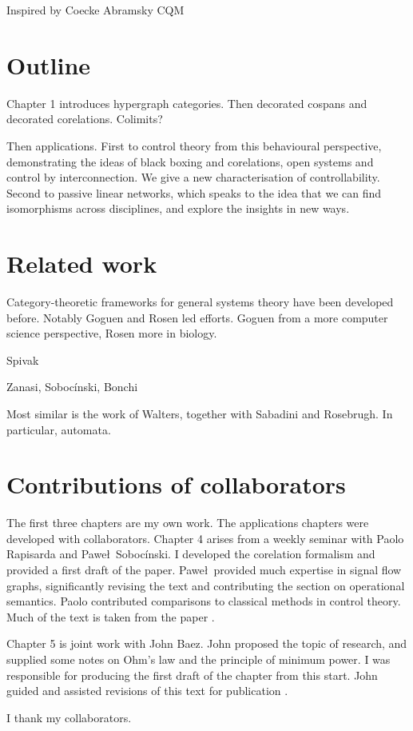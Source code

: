 Inspired by Coecke Abramsky CQM

\section{Outline}
Chapter 1 introduces hypergraph categories. Then decorated cospans and decorated
corelations. Colimits?

Then applications. First to control theory from this behavioural perspective,
demonstrating the ideas of black boxing and corelations, open systems and
control by interconnection. We give a new characterisation of controllability.
Second to passive linear networks, which speaks to the idea that we can find
isomorphisms across disciplines, and explore the insights in new ways.

\section{Related work}

Category-theoretic frameworks for general systems theory have been developed
before. Notably Goguen and Rosen led efforts. Goguen from a more computer
science perspective, Rosen more in biology.



Spivak 

Zanasi, Soboc\'inski, Bonchi

Most similar is the work of Walters, together with Sabadini and Rosebrugh. In
particular, automata.

\section{Contributions of collaborators}

The first three chapters are my own work. The applications chapters were
developed with collaborators. Chapter 4 arises from a weekly seminar with Paolo
Rapisarda and Pawe\l\ Soboc\'inski. I developed the corelation formalism and provided a
first draft of the paper. Pawe\l\ provided much expertise in signal flow graphs,
significantly revising the text and contributing the section on operational
semantics. Paolo contributed comparisons to classical methods in control theory. 
Much of the text is taken from the paper \cite{FonRapSob16}.

Chapter 5 is joint work with John Baez. John proposed the topic of research, and
supplied some notes on Ohm's law and the principle of minimum power. I
was responsible for producing the first draft of the chapter from this start.
John guided and assisted revisions of this text for publication \cite{BaeFon16}.

I thank my collaborators.
